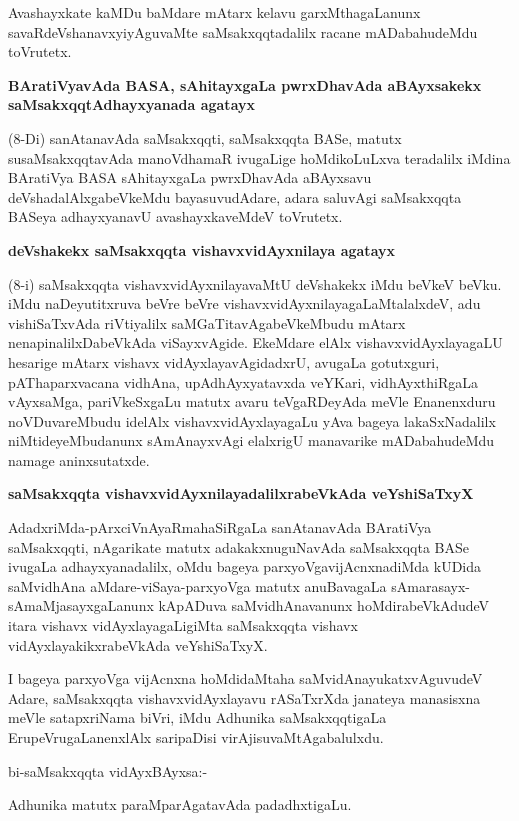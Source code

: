 Avashayxkate kaMDu baMdare mAtarx kelavu garxMthagaLanunx savaRdeVshanavxyiyAgu\-vaMte saMsakxqqtadalilx racane mADabahudeMdu toVrutetx.

{\bigskip
\noindent
{\large\bf BAratiVyavAda BASA, sAhitayxgaLa pwrxDhavAda aBAyxsakekx saMsakxqqtAdhayxyanada agatayx}}\label{page37}
\medskip

\noindent
(8-Di) sanAtanavAda saMsakxqqti, saMsakxqqta BASe, matutx susaMsakxqqtavAda manoV\-dhamaR ivu\-ga\-Lige hoMdi\-koLuLxva teradalilx iMdina BAratiVya BASA sAhitayxgaLa pwrxDhavAda aBAyxsavu deVshadalAlxgabeV\-keMdu bayasuvudAdare, adara saluvAgi saMsakxqqta BASeya adhayxyanavU avashayxkaveMdeV toVrutetx.

{\bigskip
\noindent
{\large\bf deVshakekx saMsakxqqta vishavxvidAyxnilaya agatayx}}\label{page37}
\medskip

\noindent
(8-i) saMsakxqqta vishavxvidAyxnilayavaMtU deVshakekx iMdu beVkeV beVku. iMdu naDeyutitxruva beVre beVre vishavxvidAyxnilayagaLaMtalalxdeV, adu vishiSaTxvAda riVtiyalilx saMGaTitavAgabeVkeMbudu mAtarx nenapi\-nalilxDa\-beVkAda viSayxvAgide. EkeMdare elAlx vishavxvidAyxlayagaLU hesarige mAtarx vishavx vidAyxlayavAgi\-dadxrU, avugaLa gotutxguri, pAThaparxvacana vidhAna, upAdhAyxyatavxda veYKari, vidhAyxthiRgaLa vAyxsaMga, pariVkeSxgaLu matutx avaru teVgaRDeyAda meVle Enanenxduru noVDuvareMbudu idelAlx vishavxvidAyxlaya\-gaLu yAva bageya lakaSxNadalilx niMtideyeMbudanunx sAmAnayxvAgi elalxrigU manavarike mADa\-bahu\-deMdu namage aninxsutatxde.

{\bigskip
\noindent
{\large\bf saMsakxqqta vishavxvidAyxnilayadalilxrabeVkAda veYshiSaTxyX}}\label{page37}
\medskip

\noindent
AdadxriMda-pArxciVnAyaRmahaSiRgaLa sanAtanavAda BAratiVya saMsakxqqti, nAgari\-kate matutx adakakx\-nuguNa\-vAda saMsakxqqta BASe ivugaLa adhayxyanadalilx, oMdu bageya parxyoVgavijAcnxnadiMda kUDida saMvi\-dhAna aMdare-viSaya-parxyoVga matutx anu\-BavagaLa sAmarasayx-sAmaMjasayxgaLanunx kApADuva saMvi\-dhAna\-vanunx hoMdira\-beVkAdudeV itara vishavx vidAyxlayagaLigiMta saMsakxqqta vishavx vidAyxlayakikxrabeVkAda veYshiSaTxyX.

I bageya parxyoVga vijAcnxna hoMdidaMtaha saMvidAnayukatxvAguvudeV Adare, saMsakxqqta vishavx\-vidAyxlayavu rASaTxrXda janateya manasisxna meVle satapxriNama biVri, iMdu Adhunika saMsakxqqtigaLa ErupeVru\-gaLanenxlAlx saripaDisi virAjisu\-vaMtAgabalulxdu.
\medskip

\noindent
bi-saMsakxqqta vidAyxBAyxsa:-

Adhunika matutx paraMparAgatavAda padadhxtigaLu.

